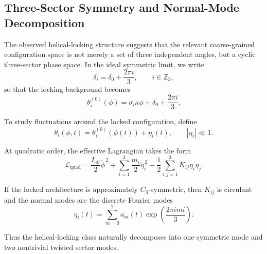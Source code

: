\documentclass[11pt]{article}
\begin{document}
    \subsection{Three-Sector Symmetry and Normal-Mode Decomposition}
        \label{subsec:three_sector_modes}
        
        The observed helical-locking structure suggests that the relevant coarse-grained configuration
        space is not merely a set of three independent angles, but a cyclic three-sector phase space.
        In the ideal symmetric limit, we write
        \begin{equation}
            \delta_i = \delta_0 + \frac{2\pi i}{3},
            \qquad i\in\mathbb{Z}_3,
        \end{equation}
        so that the locking background becomes
        \begin{equation}
            \theta_i^{(0)}(\phi)=\sigma_i \kappa \phi + \delta_0 + \frac{2\pi i}{3}.
        \end{equation}
        
        To study fluctuations around the locked configuration, define
        \begin{equation}
            \theta_i(\phi,t)=\theta_i^{(0)}(\phi(t))+\eta_i(t),
            \qquad |\eta_i|\ll 1.
        \end{equation}
        
        At quadratic order, the effective Lagrangian takes the form
        \begin{equation}
            \mathcal{L}_{\mathrm{quad}}
            =
            \frac{I_{\mathrm{eff}}}{2}\dot{\phi}^{\,2}
            +
            \sum_{i=1}^{3}\frac{m_i}{2}\dot{\eta}_i^{\,2}
            -
            \frac{1}{2}\sum_{i,j=1}^{3}K_{ij}\eta_i\eta_j.
        \end{equation}
        
        If the locked architecture is approximately \(C_3\)-symmetric, then \(K_{ij}\) is circulant and
        the normal modes are the discrete Fourier modes
        \begin{equation}
            \eta_i(t)=\sum_{m=0}^{2} a_m(t)\exp\!\left(\frac{2\pi i m i}{3}\right).
        \end{equation}
        
        Thus the helical-locking class naturally decomposes into one symmetric mode and two
        nontrivial twisted sector modes.
        
\end{document}
